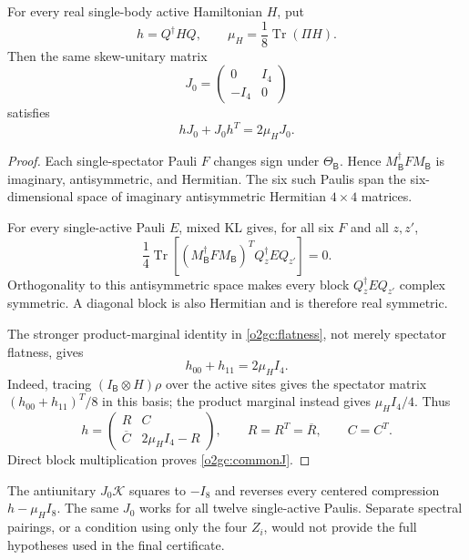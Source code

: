 \begin{lemma}
\label{o2gc:lem-commonJ}
For every real single-body active Hamiltonian \(H\), put
\[
 h=Q^\dagger HQ,\qquad
 \mu_H=\frac18\operatorname{Tr}(\Pi H).
\]
Then the same skew-unitary matrix
\begin{equation}
 J_0=\begin{pmatrix}0&I_4\\-I_4&0\end{pmatrix}
 \label{o2gc:J0}
\end{equation}
satisfies
\begin{equation}
 hJ_0+J_0h^T=2\mu_HJ_0.
 \label{o2gc:commonJ}
\end{equation}
\end{lemma}

\begin{proof}
Each single-spectator Pauli \(F\) changes sign under
\(\Theta_{\mathsf B}\). Hence \(M_{\mathsf B}^\dagger F M_{\mathsf B}\)
is imaginary, antisymmetric, and Hermitian. The six such Paulis span
the six-dimensional space of imaginary antisymmetric Hermitian
\(4\times4\) matrices.

For every single-active Pauli \(E\), mixed KL gives, for all six \(F\)
and all \(z,z'\),
\[
 \frac14\operatorname{Tr}\!\left[
 (M_{\mathsf B}^\dagger F M_{\mathsf B})^T
 Q_z^\dagger E Q_{z'}\right]=0.
\]
Orthogonality to this antisymmetric space makes every block
\(Q_z^\dagger EQ_{z'}\) complex symmetric. A diagonal block is also
Hermitian and is therefore real symmetric.

The stronger product-marginal identity in \eqref{o2gc:flatness}, not
merely spectator flatness, gives
\[
 h_{00}+h_{11}=2\mu_HI_4.
\]
Indeed, tracing \((I_{\mathsf B}\otimes H)\rho\) over the active sites
gives the spectator matrix \((h_{00}+h_{11})^T/8\) in this basis;
the product marginal instead gives \(\mu_HI_4/4\).
Thus
\[
 h=\begin{pmatrix}
 R&C\\ \overline C&2\mu_HI_4-R
 \end{pmatrix},
 \qquad R=R^T=\overline R,\qquad C=C^T.
\]
Direct block multiplication proves \eqref{o2gc:commonJ}.
\end{proof}

The antiunitary \(J_0\mathcal K\) squares to \(-I_8\) and reverses
every centered compression \(h-\mu_HI_8\). The same \(J_0\) works for
all twelve single-active Paulis. Separate spectral pairings, or a
condition using only the four \(Z_i\), would not provide the full
hypotheses used in the final certificate.


